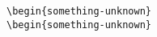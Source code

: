 \documentclass{article}
\begin{document}
\begin{verbatim}
\begin{something-unknown}
\begin{something-unknown}
\end{verbatim}
\end{document}
